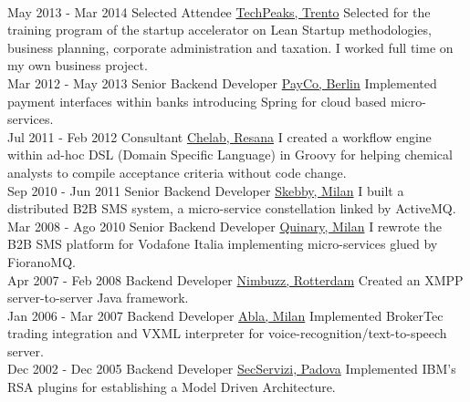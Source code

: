 \documentclass[letterpaper]{twentysecondcv} %
\begin{document}
\begin{twenty}
{{    }
        }
     \\
     \twentyitem
   		{May 2013 -}
		{Mar 2014}
        {Selected Attendee}
        {\href{https://www.repubblica.it/rubriche/startup-stories/2013/12/02/news/incubatore_startup-72502909/}{TechPeaks, Trento}}
        {}
        {
Selected for the training program of the startup accelerator on Lean Startup methodologies, business planning, corporate administration and taxation. I worked full time on my own business project.
    	}
    	\\
     \twentyitem
   		{Mar 2012 -}
		{May 2013}
        {Senior Backend Developer}
        {\href{}{PayCo, Berlin}}
        {}
        {
Implemented payment interfaces within banks introducing Spring for cloud based micro-services.
          	}
   	\\
     \twentyitem
   		{Jul 2011 -}
		{Feb 2012}
        {Consultant}
        {\href{}{Chelab, Resana}}
        {}
        {
I created a workflow engine within ad-hoc DSL (Domain Specific Language) in Groovy for helping chemical analysts to compile acceptance criteria without code change.
       	}
   	\\
     \twentyitem
   		{Sep 2010 -}
		{Jun 2011}
        {Senior Backend Developer}
        {\href{}{Skebby, Milan}}
        {}
        {
I built a distributed B2B SMS system, a micro-service constellation linked by ActiveMQ.
       	}
   	\\
     \twentyitem
   		{Mar 2008 -}
		{Ago 2010}
        {Senior Backend Developer}
        {\href{}{Quinary, Milan}}
        {}
        {
      I rewrote the B2B SMS platform for Vodafone Italia implementing micro-services glued by FioranoMQ.
       	}
   	\\
     \twentyitem
   		{Apr 2007 -}
		{Feb 2008}
        {Backend Developer}
        {\href{}{Nimbuzz, Rotterdam}}
        {}
        {
      Created an XMPP server-to-server Java framework.
       	}
   	\\
     \twentyitem
   		{Jan 2006 -}
		{Mar 2007}
        {Backend Developer}
        {\href{}{Abla, Milan}}
        {}
        {
      Implemented BrokerTec trading integration and VXML interpreter for  voice-recognition/text-to-speech server.
       	}
   	\\
     \twentyitem
   		{Dec 2002 -}
		{Dec 2005}
        {Backend Developer}
        {\href{}{SecServizi, Padova}}
        {}
        {
    Implemented IBM's RSA plugins for establishing a Model Driven Architecture.
       	}
        
\end{twenty}
\end{document}
